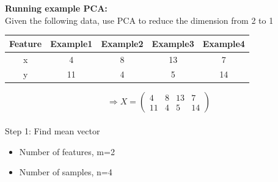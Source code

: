 \documentclass[a4paper, 12pt]{report}
\begin{document}
\textbf{Running example PCA:}\\
Given the following data, use PCA to reduce the dimension from 2 to 1
\begin{center}
 \begin{tabular}{||c|c|c|c|c||} 
 \hline
 Feature & Example1 & Example2 & Example3 & Example4 \\ [0.5ex] 
 \hline\hline
 x & 4 & 8&13 & 7 \\ 
 \hline
 y & 11 & 4 & 5&14 \\
 \hline

\end{tabular}
\end{center}
$$\Rightarrow X=\begin{pmatrix} 4 & 8 & 13 & 7\ \\ 11 & 4 & 5 & 14 \end{pmatrix}$$\\
\indent Step 1: Find mean vector
\begin{itemize}
    \item Number of features, m=2
    \item Number of samples, n=4
\end{itemize}
\end{document}
